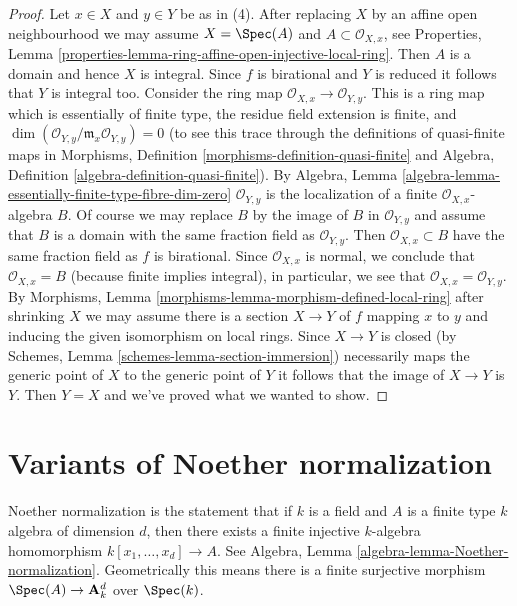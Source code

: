 \begin{proof}
\medskip\noindent
Let $x \in X$ and $y \in Y$ be as in (4). After replacing $X$
by an affine open neighbourhood we may assume $X = \Spec(A)$
and $A \subset \mathcal{O}_{X, x}$, see
Properties, Lemma \ref{properties-lemma-ring-affine-open-injective-local-ring}.
Then $A$ is a domain and hence $X$ is integral.
Since $f$ is birational and $Y$ is reduced
it follows that $Y$ is integral too. Consider the ring map
$\mathcal{O}_{X, x} \to \mathcal{O}_{Y, y}$. This is a ring map
which is essentially of finite type, the residue field extension
is finite, and $\dim(\mathcal{O}_{Y, y}/\mathfrak m_x\mathcal{O}_{Y, y}) = 0$
(to see this trace through the definitions of quasi-finite
maps in
Morphisms, Definition \ref{morphisms-definition-quasi-finite} and
Algebra, Definition \ref{algebra-definition-quasi-finite}). By
Algebra, Lemma \ref{algebra-lemma-essentially-finite-type-fibre-dim-zero}
$\mathcal{O}_{Y, y}$ is the localization of a finite
$\mathcal{O}_{X, x}$-algebra $B$. Of course we may replace
$B$ by the image of $B$ in $\mathcal{O}_{Y, y}$ and assume
that $B$ is a domain with the same fraction field as $\mathcal{O}_{Y, y}$.
Then $\mathcal{O}_{X, x} \subset B$
have the same fraction field as $f$ is birational. Since
$\mathcal{O}_{X, x}$ is normal, we conclude that
$\mathcal{O}_{X, x} = B$ (because finite implies integral),
in particular, we see that $\mathcal{O}_{X, x} = \mathcal{O}_{Y, y}$. By
Morphisms, Lemma \ref{morphisms-lemma-morphism-defined-local-ring}
after shrinking $X$ we may assume there is a section
$X \to Y$ of $f$ mapping $x$ to $y$ and inducing the given
isomorphism on local rings. Since $X \to Y$ is closed
(by Schemes, Lemma \ref{schemes-lemma-section-immersion})
necessarily maps the generic point of $X$ to the generic point of $Y$
it follows that the image of $X \to Y$ is $Y$.
Then $Y = X$ and we've proved what we wanted to show.
\end{proof}






\section{Variants of Noether normalization}
\label{section-noether-normalization}

\noindent
Noether normalization is the statement that if $k$ is a field
and $A$ is a finite type $k$ algebra of dimension $d$, then
there exists a finite injective $k$-algebra homomorphism
$k[x_1, \ldots, x_d] \to A$. See
Algebra, Lemma \ref{algebra-lemma-Noether-normalization}.
Geometrically this means there
is a finite surjective morphism $\Spec(A) \to \mathbf{A}^d_k$
over $\Spec(k)$.

